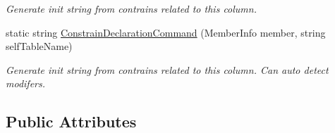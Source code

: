 \begin{DoxyCompactItemize}
\begin{DoxyCompactList}\small\item\em Generate init string from contrains related to this column. \end{DoxyCompactList}\item 
static string \mbox{\hyperlink{class_uniform_data_operator_1_1_sql_1_1_attributes_1_1_is_foreign_key_ae1dae3d2e36c2c38fe5306b42209ef74}{Constrain\+Declaration\+Command}} (Member\+Info member, string self\+Table\+Name)
\begin{DoxyCompactList}\small\item\em Generate init string from contrains related to this column. Can auto detect modifers. \end{DoxyCompactList}\end{DoxyCompactItemize}
\subsection*{Public Attributes}
